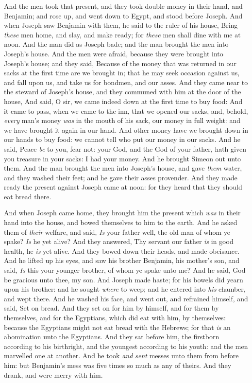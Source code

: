 \documentclass[11pt,letterpaper,oneside]{memoir}
\begin{document}
And the men took that present, and they took double money in their hand,
and Benjamin; and rose up, and went down to Egypt, and stood before
Joseph. And when Joseph saw Benjamin with them, he said to the ruler of
his house, Bring \emph{these} men home, and slay, and make ready; for
\emph{these} men shall dine with me at noon. And the man did as Joseph
bade; and the man brought the men into Joseph's house. And the men were
afraid, because they were brought into Joseph's house; and they said,
Because of the money that was returned in our sacks at the first time
are we brought in; that he may seek occasion against us, and fall upon
us, and take us for bondmen, and our asses. And they came near to the
steward of Joseph's house, and they communed with him at the door of the
house, And said, O sir, we came indeed down at the first time to buy
food: And it came to pass, when we came to the inn, that we opened our
sacks, and, behold, \emph{every} man's money \emph{was} in the mouth of
his sack, our money in full weight: and we have brought it again in our
hand. And other money have we brought down in our hands to buy food: we
cannot tell who put our money in our sacks. And he said, Peace \emph{be}
to you, fear not: your God, and the God of your father, hath given you
treasure in your sacks: I had your money. And he brought Simeon out unto
them. And the man brought the men into Joseph's house, and gave
\emph{them} water, and they washed their feet; and he gave their asses
provender. And they made ready the present against Joseph came at noon:
for they heard that they should eat bread there.

And when Joseph came home, they brought him the present which \emph{was}
in their hand into the house, and bowed themselves to him to the earth.
And he asked them of \emph{their} welfare, and said, \emph{Is} your
father well, the old man of whom ye spake? \emph{Is} he yet alive? And
they answered, Thy servant our father \emph{is} in good health, he
\emph{is} yet alive. And they bowed down their heads, and made
obeisance. And he lifted up his eyes, and saw his brother Benjamin, his
mother's son, and said, \emph{Is} this your younger brother, of whom ye
spake unto me? And he said, God be gracious unto thee, my son. And
Joseph made haste; for his bowels did yearn upon his brother: and he
sought \emph{where} to weep; and he entered into \emph{his} chamber, and
wept there. And he washed his face, and went out, and refrained himself,
and said, Set on bread. And they set on for him by himself, and for them
by themselves, and for the Egyptians, which did eat with him, by
themselves: because the Egyptians might not eat bread with the Hebrews;
for that \emph{is} an abomination unto the Egyptians. And they sat
before him, the firstborn according to his birthright, and the youngest
according to his youth: and the men marvelled one at another. And he
took \emph{and sent} messes unto them from before him: but Benjamin's
mess was five times so much as any of theirs. And they drank, and were
merry with him.
\end{document}
